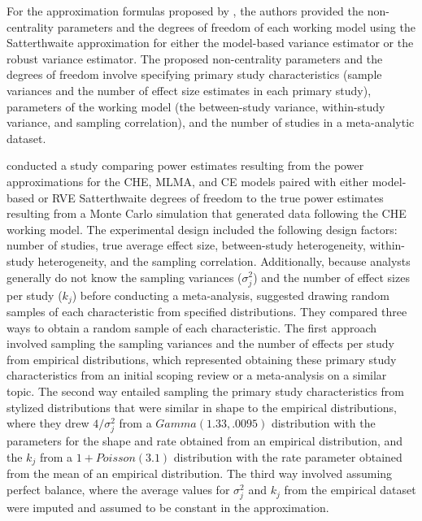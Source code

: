 For the approximation formulas proposed by \textcite{vembye2023}, the authors provided the non-centrality parameters and the degrees of freedom of each working model using the Satterthwaite approximation for either the model-based variance estimator or the robust variance estimator. The proposed non-centrality parameters and the degrees of freedom involve specifying primary study characteristics (sample variances and the number of effect size estimates in each primary study), parameters of the working model (the between-study variance, within-study variance, and sampling correlation), and the number of studies in a meta-analytic dataset.  

\textcite{vembye2023} conducted a study comparing power estimates resulting from the power approximations for the CHE, MLMA, and CE models paired with either model-based or RVE Satterthwaite degrees of freedom to the true power estimates resulting from a Monte Carlo simulation that generated data following the CHE working model. The experimental design included the following design factors: number of studies, true average effect size, between-study heterogeneity, within-study heterogeneity, and the sampling correlation. Additionally, because analysts generally do not know the sampling variances ($\sigma^2_j$) and the number of effect sizes per study ($k_j$) before conducting a meta-analysis, \textcite{vembye2023} suggested drawing random samples of each characteristic from specified distributions. They compared three ways to obtain a random sample of each characteristic. The first approach involved sampling the sampling variances and the number of effects per study from empirical distributions, which represented obtaining these primary study characteristics from an initial scoping review or a meta-analysis on a similar topic. The second way entailed sampling the primary study characteristics from stylized distributions that were similar in shape to the empirical distributions, where they drew $4/\sigma^2_j$ from a $Gamma(1.33, .0095)$ distribution with the parameters for the shape and rate obtained from an empirical distribution, and the $k_j$ from a $1 + Poisson(3.1)$ distribution with the rate parameter obtained from the mean of an empirical distribution. The third way involved assuming perfect balance, where the average values for $\sigma_j^2$ and $k_j$ from the empirical dataset were imputed and assumed to be constant in the approximation. 

